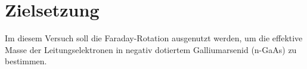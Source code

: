 \section{Zielsetzung}
\label{sec:zielsetzung}

Im diesem Versuch soll die Faraday-Rotation ausgenutzt werden, um die effektive Masse der Leitungselektronen in negativ
dotiertem Galliumarsenid (n-GaAs) zu bestimmen.
